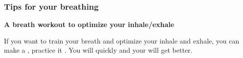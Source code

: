 \begin{frame}
  \frametitle{Tips for your breathing}

  \textbf{A breath workout to optimize your inhale/exhale}

     \vspace{5 mm}

     If you want to train your breath and optimize your inhale and exhale, you can make a ,
     practice it .
  You will quickly  and your  will get better.

  \end{frame}


